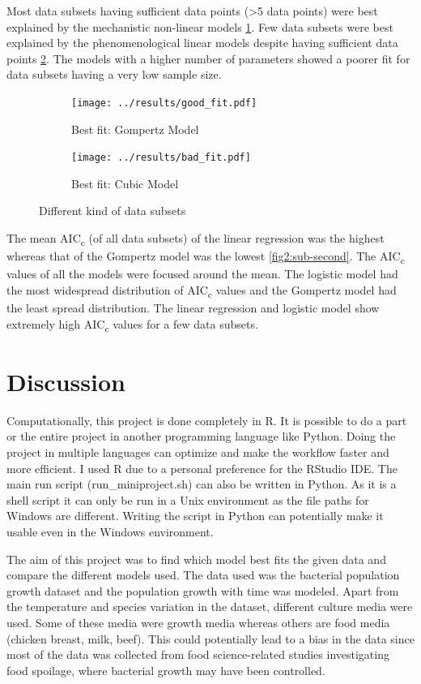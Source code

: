 \documentclass[11pt]{article}
\begin{document}
Most data subsets having sufficient data points (>5 data points) were best explained by the mechanistic non-linear models \ref{fig3:sub-first}. Few data subsets were best explained by the phenomenological linear models despite having sufficient data points \ref{fig3:sub-second}. The models with a higher number of parameters showed a poorer fit for data subsets having a very low sample size. 

\begin{figure}[!ht]
\begin{subfigure}{.49\textwidth}
  \centering
  \texttt{[image: ../results/good\_fit.pdf]}
  \caption{Best fit: Gompertz Model}
  \label{fig3:sub-first}
\end{subfigure}
\begin{subfigure}{.49\textwidth}
  \centering
  \texttt{[image: ../results/bad\_fit.pdf]}  
  \caption{Best fit: Cubic Model}
  \label{fig3:sub-second}
\end{subfigure}
\caption{Different kind of data subsets}
\label{fig:fig3}
\end{figure}

The mean AIC\textsubscript{c} (of all data subsets) of the linear regression was the highest whereas that of the Gompertz model was the lowest \ref{fig2:sub-second}. The AIC\textsubscript{c} values of all the models were focused around the mean. The logistic model had the most widespread distribution of AIC\textsubscript{c} values and the Gompertz model had the least spread distribution. The linear regression and logistic model show extremely high AIC\textsubscript{c} values for a few data subsets. 

\section{Discussion}

Computationally, this project is done completely in R. It is possible to do a part or the entire project in another programming language like Python. Doing the project in multiple languages can optimize and make the workflow faster and more efficient. I used R due to a personal preference for the RStudio IDE. The main run script (run\_miniproject.sh) can also be written in Python. As it is a shell script it can only be run in a Unix environment as the file paths for Windows are different. Writing the script in Python can potentially make it usable even in the Windows environment. 

The aim of this project was to find which model best fits the given data and compare the different models used. The data used was the bacterial population growth dataset and the population growth with time was modeled. Apart from the temperature and species variation in the dataset, different culture media were used. Some of these media were growth media whereas others are food media (chicken breast, milk, beef). This could potentially lead to a bias in the data since most of the data was collected from food science-related studies investigating food spoilage, where bacterial growth may have been controlled.
\end{document}
